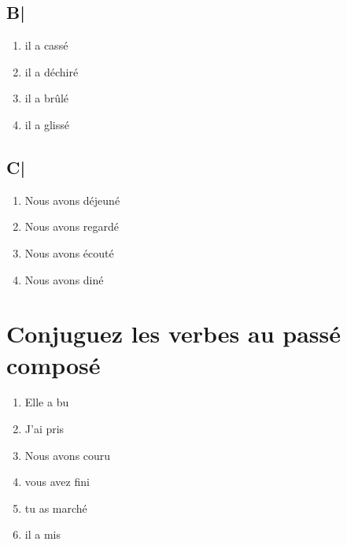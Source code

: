 \subsection{B|}

\begin{enumerate}
    \item il a cassé
    \item il a déchiré
    \item il a brûlé
    \item il a glissé
\end{enumerate}

\subsection{C|}

\begin{enumerate}
    \item Nous avons déjeuné
    \item Nous avons regardé
    \item Nous avons écouté
    \item Nous avons diné
\end{enumerate}

\section{Conjuguez les verbes au passé composé}

\begin{enumerate}
    \item Elle a bu 
    \item J'ai pris
    \item Nous avons couru
    \item vous avez fini
    \item tu as marché
    \item il a mis
\end{enumerate}